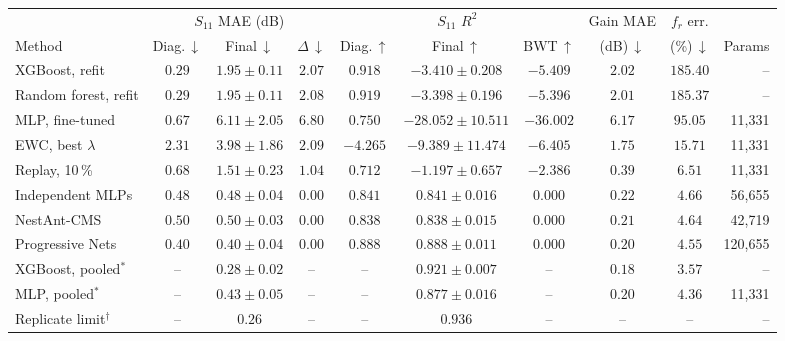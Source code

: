 \begin{tabular}{@{}lccccccccr@{}}
\toprule
 & \multicolumn{3}{c}{$S_{11}$ MAE (dB)} & \multicolumn{3}{c}{$S_{11}$ $R^2$} & Gain MAE & $f_r$ err. & \\
\cmidrule(lr){2-4}\cmidrule(lr){5-7}
Method & Diag.\,$\downarrow$ & Final\,$\downarrow$ & $\Delta$\,$\downarrow$ & Diag.\,$\uparrow$ & Final\,$\uparrow$ & BWT\,$\uparrow$ & (dB)\,$\downarrow$ & (\%)\,$\downarrow$ & Params \\
\midrule
XGBoost, refit & $0.29$ & $1.95\pm0.11$ & $2.07$ & $0.918$ & $-3.410\pm0.208$ & $-5.409$ & $2.02$ & $185.40$ & -- \\
Random forest, refit & $0.29$ & $1.95\pm0.11$ & $2.08$ & $0.919$ & $-3.398\pm0.196$ & $-5.396$ & $2.01$ & $185.37$ & -- \\
MLP, fine-tuned & $0.67$ & $6.11\pm2.05$ & $6.80$ & $0.750$ & $-28.052\pm10.511$ & $-36.002$ & $6.17$ & $95.05$ & 11{,}331 \\
EWC, best $\lambda$ & $2.31$ & $3.98\pm1.86$ & $2.09$ & $-4.265$ & $-9.389\pm11.474$ & $-6.405$ & $1.75$ & $15.71$ & 11{,}331 \\
Replay, 10\,\% & $0.68$ & $1.51\pm0.23$ & $1.04$ & $0.712$ & $-1.197\pm0.657$ & $-2.386$ & $0.39$ & $6.51$ & 11{,}331 \\
Independent MLPs & $0.48$ & $0.48\pm0.04$ & $0.00$ & $0.841$ & $0.841\pm0.016$ & $0.000$ & $0.22$ & $4.66$ & 56{,}655 \\
NestAnt-CMS & $0.50$ & $0.50\pm0.03$ & $0.00$ & $0.838$ & $0.838\pm0.015$ & $0.000$ & $0.21$ & $4.64$ & 42{,}719 \\
Progressive Nets & $0.40$ & $0.40\pm0.04$ & $0.00$ & $0.888$ & $0.888\pm0.011$ & $0.000$ & $0.20$ & $4.55$ & 120{,}655 \\
\midrule
XGBoost, pooled$^\ast$ & -- & $0.28\pm0.02$ & -- & -- & $0.921\pm0.007$ & -- & $0.18$ & $3.57$ & -- \\
MLP, pooled$^\ast$ & -- & $0.43\pm0.05$ & -- & -- & $0.877\pm0.016$ & -- & $0.20$ & $4.36$ & 11{,}331 \\
Replicate limit$^\dagger$ & -- & $0.26$ & -- & -- & $0.936$ & -- & -- & -- & -- \\
\bottomrule
\end{tabular}

